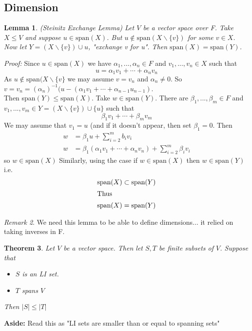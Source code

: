 \documentclass{report}
\newtheorem{theorem}{Theorem}[subsection]
\newtheorem{lemma}[theorem]{Lemma}
\theoremstyle{remark}
\newtheorem{remark}[theorem]{Remark}
\theoremstyle{definition}
\theoremstyle{definition}
\theoremstyle{theorem}
\begin{document}
\subsection{Dimension}
\begin{lemma}
(\emph{Steinitz Exchange Lemma})
Let $V$ be a vector space over F. Take $X \leq V$ and suppose $u \in \text{span}(X)$. But $u \notin \text{span}(X \backslash \{v\})$ for some $v \in X$. Now let $Y = (X \backslash \{v\}) \cup u$, "exchange v for u". Then $\text{span}(X) = \text{span}(Y)$.
\end{lemma} 
\emph{Proof:} Since $u \in \text{span}(X)$ we have $\alpha_1, ..., \alpha_n \in F$ and $v_1, ..., v_n \in X$ such that
\[u = \alpha_1v_1 + \cdots + \alpha_nv_n\]
As $u \notin \text{span}(X \backslash \{v\}$ we may assume $v = v_n$ and $\alpha_n \neq 0$. So $v = v_n = (\alpha_n)^{-1}(u - (\alpha_1v_1 + \cdots + \alpha_{n-1}u_{n-1})$.\\
Then span$(Y) \leq \text{span}(X)$. Take $w \in \text{span}(Y)$. There are $\beta_1, ..., \beta_m \in F$ and $v_1, ..., v_m \in Y = (X \backslash \{v\}) \cup \{u\}$ such that
\[\beta_1v_1 + \cdots + \beta_m v_m\]
We may assume that $v_1 = u$ (and if it doesn't appear, then set $\beta_1 =0$. Then 
\begin{align*}
    w &= \beta_1u + \sum^m_{i=2}b_iv_i\\
    w &= \beta_1(\alpha_1v_1 + \cdots + \alpha_nv_n) + \sum^m_{i=2} \beta_iv_i
\end{align*}
so $w \in \text{span}(X)$ Similarly, using the case if $w \in \text{span}(X)$ then $w \in \text{span}(Y)$ i.e. 
\begin{align*}
    \text{span}(X) &\subset \text{span}(Y)\\
    \intertext{Thus}
    \text{span}(X) &= \text{span}(Y) 
\end{align*}
\begin{remark}
We need this lemma to be able to define dimensions... it relied on taking inverses in F.
\end{remark}
\begin{theorem}
Let $V$ be a vector space. Then let $S, T$ be finite subsets of $V$. Suppose that
\begin{itemize}
    \item $S$ is an LI set.
    \item $T$ spans $V$
\end{itemize}
Then $|S| \leq |T|$
\end{theorem}
\textbf{Aside:} Read this as "LI sets are smaller than or equal to spanning sets" \par
\end{document}
